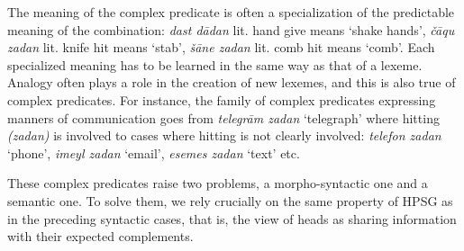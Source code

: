 \documentclass[output=paper]{langsci/langscibook}
\begin{document}
{\begin{exe}
	\ex \label{GSexemple68} 
	\begin{xlist}
        \label{GSexemple68a}
		
	    \label{GSexemple68b}
		
		\end{xlist}
\end{exe}

\begin{exe}
	\ex \label{GSexemple69} 
	\begin{xlist}
        \label{GSexemple69a}
		
	    \label{GSexemple69b}
		
		\end{xlist}
\end{exe}

The meaning of the complex predicate is often a specialization of the predictable meaning of the combination: \textit{dast d\=adan} lit. hand give means `shake hands', \textit{\v c\=aqu zadan} lit. knife hit means `stab', \textit{\v s\=ane zadan} lit. comb hit means `comb'. Each specialized meaning has to be learned in the same way as that of a lexeme. Analogy often plays a role in the creation of new lexemes, and this is also true of complex predicates. For instance, the family of complex predicates expressing manners of communication goes from \textit{telegr\=am zadan} `telegraph' where hitting \textit{(zadan)} is involved to cases where hitting is not clearly involved: \textit{telefon zadan} `phone’, \textit{imeyl zadan} `email', \textit{esemes zadan} `text' etc.   

These complex predicates raise two problems, a morpho-syntactic one and a semantic one. To solve them, we rely crucially on the same property of HPSG as in the preceding syntactic cases, that is, the view of heads as sharing information with their expected complements. 

}
\end{document}
